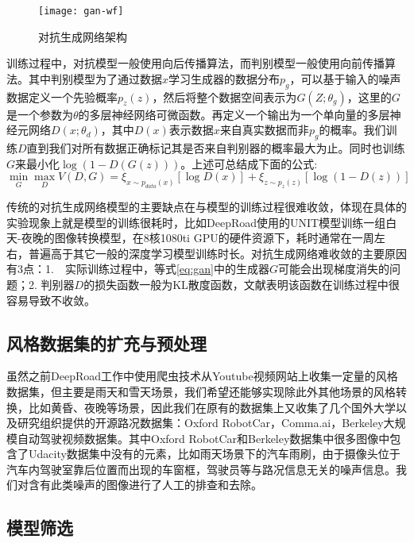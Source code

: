 \begin{figure}[h]
    \centering
    \texttt{[image: gan-wf]}
    \caption{对抗生成网络架构}
    \label{gan-wf}
\end{figure}

训练过程中，对抗模型一般使用向后传播算法，而判别模型一般使用向前传播算法。其中判别模型为了通过数据$x$学习生成器的数据分布$p_g$，可以基于输入的噪声数据定义一个先验概率$p_z(z)$，然后将整个数据空间表示为$G(Z;\theta_g)$，这里的$G$是一个参数为$\theta$的多层神经网络可微函数。再定义一个输出为一个单向量的多层神经元网络$D(x;\theta_d)$，其中$D(x)$表示数据$x$来自真实数据而非$p_g$的概率。我们训练$D$直到我们对所有数据正确标记其是否来自判别器的概率最大为止。同时也训练$G$来最小化$\log(1-D(G(z)))$。上述可总结成下面的公式:
\begin{equation}
    \label{eq:gan}
    \min_G\max_DV(D,G)=\xi_{x\sim p_{data}(x)}[\log D(x)]+\xi_{z\sim p_z(z)}[\log(1-D(z))]
\end{equation}

传统的对抗生成网络模型的主要缺点在与模型的训练过程很难收敛，体现在具体的实验现象上就是模型的训练很耗时，比如DeepRoad使用的UNIT模型训练一组白天-夜晚的图像转换模型，在8核1080ti GPU的硬件资源下，耗时通常在一周左右，普遍高于其它一般的深度学习模型训练时长。对抗生成网络难收敛的主要原因有3点：1.　实际训练过程中，等式\eqref{eq:gan}中的生成器$G$可能会出现梯度消失的问题；2. 判别器$D$的损失函数一般为KL散度函数，文献\cite{arj}表明该函数在训练过程中很容易导致不收敛。

\subsection{风格数据集的扩充与预处理}

虽然之前DeepRoad工作中使用爬虫技术从Youtube视频网站上收集一定量的风格数据集，但主要是雨天和雪天场景，我们希望还能够实现除此外其他场景的风格转换，比如黄昏、夜晚等场景，因此我们在原有的数据集上又收集了几个国外大学以及研究组织提供的开源路况数据集：Oxford RobotCar\cite{ds:oxford}，Comma.ai\cite{ds:ai}，Berkeley大规模自动驾驶视频数据集\cite{ds:berkeley}。其中Oxford RobotCar和Berkeley数据集中很多图像中包含了Udacity数据集中没有的元素，比如雨天场景下的汽车雨刷，由于摄像头位于汽车内驾驶室靠后位置而出现的车窗框，驾驶员等与路况信息无关的噪声信息。我们对含有此类噪声的图像进行了人工的排查和去除。

\subsection{模型筛选}

